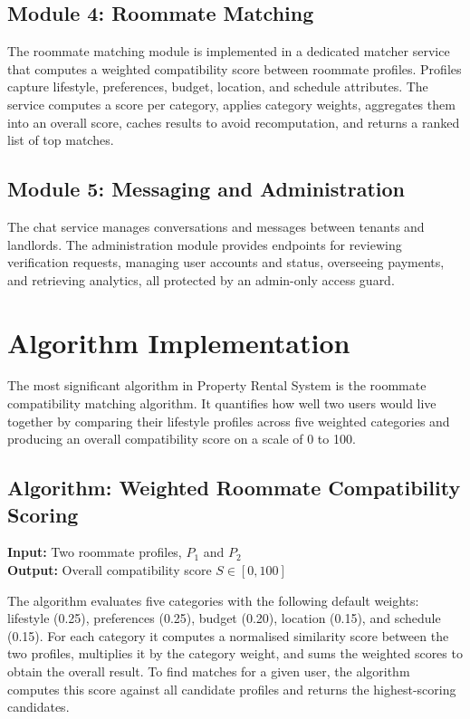 \subsection{Module 4: Roommate Matching}

The roommate matching module is implemented in a dedicated matcher service that computes a weighted compatibility score between roommate profiles. Profiles capture lifestyle, preferences, budget, location, and schedule attributes. The service computes a score per category, applies category weights, aggregates them into an overall score, caches results to avoid recomputation, and returns a ranked list of top matches.

\subsection{Module 5: Messaging and Administration}

The chat service manages conversations and messages between tenants and landlords. The administration module provides endpoints for reviewing verification requests, managing user accounts and status, overseeing payments, and retrieving analytics, all protected by an admin-only access guard.


\section{Algorithm Implementation}

The most significant algorithm in Property Rental System is the roommate compatibility matching algorithm. It quantifies how well two users would live together by comparing their lifestyle profiles across five weighted categories and producing an overall compatibility score on a scale of 0 to 100.

\subsection{Algorithm: Weighted Roommate Compatibility Scoring}

\textbf{Input:} Two roommate profiles, $P_1$ and $P_2$ \\
\textbf{Output:} Overall compatibility score $S \in [0, 100]$

The algorithm evaluates five categories with the following default weights: lifestyle (0.25), preferences (0.25), budget (0.20), location (0.15), and schedule (0.15). For each category it computes a normalised similarity score between the two profiles, multiplies it by the category weight, and sums the weighted scores to obtain the overall result. To find matches for a given user, the algorithm computes this score against all candidate profiles and returns the highest-scoring candidates.

